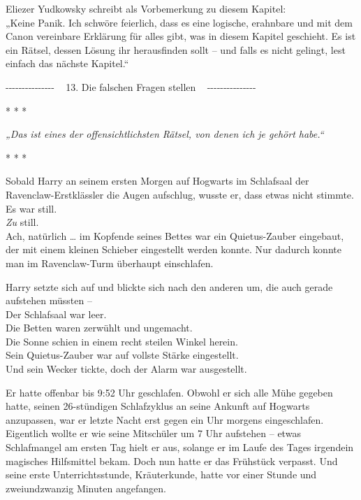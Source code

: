 

\hypertarget{die-falschen-fragen-stellen}{%

Eliezer Yudkowsky schreibt als Vorbemerkung zu diesem Kapitel:\\ „Keine Panik. Ich schwöre feierlich, dass es eine logische, erahnbare und mit dem Canon vereinbare Erklärung für alles gibt, was in diesem Kapitel geschieht. Es ist ein Rätsel, dessen Lösung ihr herausfinden sollt -- und falls es nicht gelingt, lest einfach das nächste Kapitel.“

-\/-\/-\/-\/-\/-\/-\/-\/-\/-\/-\/-\/-\/-\/- ~ 13. Die falschen Fragen stellen ~ -\/-\/-\/-\/-\/-\/-\/-\/-\/-\/-\/-\/-\/-\/-

* * *

\hfill\break \emph{„Das ist eines der offensichtlichsten Rätsel, von denen ich je gehört habe.“}

* * *

Sobald Harry an seinem ersten Morgen auf Hogwarts im Schlafsaal der Ravenclaw-Erstklässler die Augen aufschlug, wusste er, dass etwas nicht stimmte.\\ Es war still.\\ \emph{Zu} still.\\ Ach, natürlich … im Kopfende seines Bettes war ein Quietus-Zauber eingebaut, der mit einem kleinen Schieber eingestellt werden konnte. Nur dadurch konnte man im Ravenclaw-Turm überhaupt einschlafen.

Harry setzte sich auf und blickte sich nach den anderen um, die auch gerade aufstehen müssten --\\ Der Schlafsaal war leer.\\ Die Betten waren zerwühlt und ungemacht.\\ Die Sonne schien in einem recht steilen Winkel herein.\\ Sein Quietus-Zauber war auf vollste Stärke eingestellt.\\ Und sein Wecker tickte, doch der Alarm war ausgestellt.

Er hatte offenbar bis 9:52 Uhr geschlafen. Obwohl er sich alle Mühe gegeben hatte, seinen 26-stündigen Schlafzyklus an seine Ankunft auf Hogwarts anzupassen, war er letzte Nacht erst gegen ein Uhr morgens eingeschlafen. Eigentlich wollte er wie seine Mitschüler um 7 Uhr aufstehen -- etwas Schlafmangel am ersten Tag hielt er aus, solange er im Laufe des Tages irgendein magisches Hilfsmittel bekam. Doch nun hatte er das Frühstück verpasst. Und seine erste Unterrichtsstunde, Kräuterkunde, hatte vor einer Stunde und zweiundzwanzig Minuten angefangen.

}
